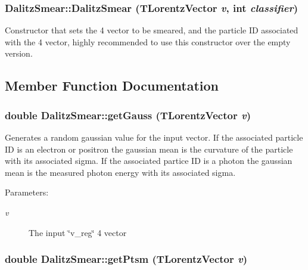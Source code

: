 \subsubsection{\setlength{\rightskip}{0pt plus 5cm}Dalitz\-Smear::Dalitz\-Smear (TLorentz\-Vector {\em v}, int {\em classifier})}\label{classDalitzSmear_d76d70d15e07a9264c54a6052458e4d9}


Constructor that sets the 4 vector to be smeared, and the particle ID associated with the 4 vector, highly recommended to use this constructor over the empty version. 



\subsection{Member Function Documentation}
\subsubsection{\setlength{\rightskip}{0pt plus 5cm}double Dalitz\-Smear::get\-Gauss (TLorentz\-Vector {\em v})\hspace{0.3cm}{\tt  [private]}}\label{classDalitzSmear_18fa31b26891f1138adff5dea3a8f558}


Generates a random gaussian value for the input vector. If the associated particle ID is an electron or positron the gaussian mean is the curvature of the particle with its associated sigma. If the associated partice ID is a photon the gaussian mean is the measured photon energy with its associated sigma. 

\begin{Desc}
\item[Parameters:]
\begin{description}
\item[{\em v}]The input \char`\"{}v\_\-reg\char`\"{} 4 vector \end{description}
\end{Desc}
\subsubsection{\setlength{\rightskip}{0pt plus 5cm}double Dalitz\-Smear::get\-Ptsm (TLorentz\-Vector {\em v})\hspace{0.3cm}{\tt  [private]}}\label{classDalitzSmear_811ae82c27b64f7049a3844148348cc9}


